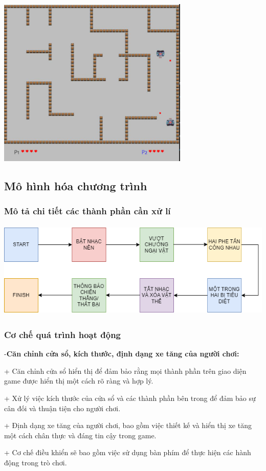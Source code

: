 \documentclass[a4paper]{article}
\begin{document}
\includegraphics[width=3.58194in,height=3.19583in]{image26.png}
\newpage
\subsection{Mô hình hóa chương trình}
\subsubsection{Mô tả chi tiết các thành phần cần xử lí}
\includegraphics[width=5.53194in,height=1.82222in]{image27.png}
\subsubsection{Cơ chế quá trình hoạt động}
-\textbf{Căn chỉnh cửa sổ, kích thước, định dạng xe tăng của người
chơi:}

+ Căn chỉnh cửa sổ hiển thị để đảm bảo rằng mọi thành phần trên giao
diện game được hiển thị một cách rõ ràng và hợp lý.

+ Xử lý việc kích thước của cửa sổ và các thành phần bên trong để đảm
bảo sự cân đối và thuận tiện cho người chơi.

+ Định dạng xe tăng của người chơi, bao gồm việc thiết kế và hiển thị xe
tăng một cách chân thực và đáng tin cậy trong game.

+ Cơ chế điều khiển sẽ bao gồm việc sử dụng bàn phím để thực hiện các
hành động trong trò chơi.
\end{document}
